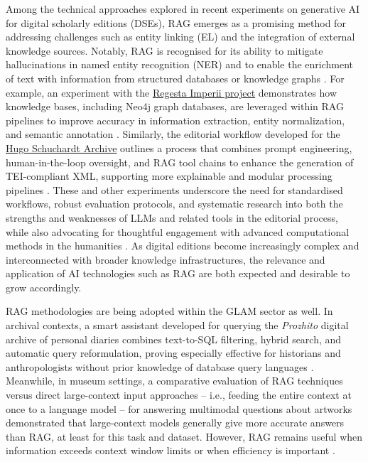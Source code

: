 \begin{spacing}{1.5}
Among the technical approaches explored in recent experiments on generative AI for digital scholarly editions (DSEs), RAG emerges as a promising method for addressing challenges such as entity linking (EL) and the integration of external knowledge sources. Notably, RAG is recognised for its ability to mitigate hallucinations in named entity recognition (NER) and to enable the enrichment of text with information from structured databases or knowledge graphs \citep{pollin_when_2025}. For example, an experiment with the \href{https://www.regesta-imperii.de/en/home.html}{Regesta Imperii project}\nocite{noauthor_home_nodate} demonstrates how knowledge bases, including Neo4j graph databases, are leveraged within RAG pipelines to improve accuracy in information extraction, entity normalization, and semantic annotation \citep{kuczera_chatgpt_2024}. Similarly, the editorial workflow developed for the \href{https://web.archive.org/web/20241120122545/https://gams.uni-graz.at/context:hsa}{Hugo Schuchardt Archive} outlines a process that combines prompt engineering, human-in-the-loop oversight, and RAG tool chains to enhance the generation of TEI-compliant XML, supporting more explainable and modular processing pipelines \citep{pollin_new_2023}. These and other experiments underscore the need for standardised workflows, robust evaluation protocols, and systematic research into both the strengths and weaknesses of LLMs and related tools in the editorial process, while also advocating for thoughtful engagement with advanced computational methods in the humanities \citep{pollin_workshop_2024}. As digital editions become increasingly complex and interconnected with broader knowledge infrastructures, the relevance and application of AI technologies such as RAG are both expected and desirable to grow accordingly.

RAG methodologies are being adopted within the GLAM sector as well. In archival contexts, a smart assistant developed for querying the \textit{Prozhito} digital archive of personal diaries combines text-to-SQL filtering, hybrid search, and automatic query reformulation, proving especially effective for historians and anthropologists without prior knowledge of database query languages  \citep{sergeev_talking_2025}. Meanwhile, in museum settings, a comparative evaluation of RAG techniques versus direct large-context input approaches -- i.e., feeding the entire context at once to a language model -- for answering multimodal questions about artworks demonstrated that large-context models generally give more accurate answers than RAG, at least for this task and dataset. However, RAG remains useful when information exceeds context window limits or when efficiency is important \citep{ramos-varela_context_2025}.


\end{spacing}
